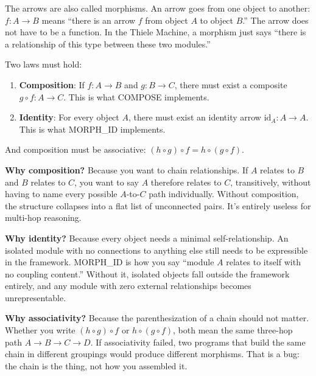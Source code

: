 \documentclass[11pt,a4paper]{article}
\theoremstyle{plain}
\theoremstyle{definition}
\theoremstyle{remark}
\begin{document}
The arrows are also called morphisms. An arrow goes from one object to another: $f : A \to B$ means ``there is an arrow $f$ from object $A$ to object $B$.'' The arrow does not have to be a function. In the Thiele Machine, a morphism just says ``there is a relationship of this type between these two modules.''

Two laws must hold:
\begin{enumerate}
\item \textbf{Composition}: If $f : A \to B$ and $g : B \to C$, there must exist a composite $g \circ f : A \to C$. This is what COMPOSE implements.
\item \textbf{Identity}: For every object $A$, there must exist an identity arrow $\text{id}_A : A \to A$. This is what MORPH\_ID implements.
\end{enumerate}

And composition must be associative: $(h \circ g) \circ f = h \circ (g \circ f)$.

\medskip
\noindent\textbf{Why composition?} Because you want to chain relationships. If $A$ relates to $B$ and $B$ relates to $C$, you want to say $A$ therefore relates to $C$, transitively, without having to name every possible $A$-to-$C$ path individually. Without composition, the structure collapses into a flat list of unconnected pairs. It's entirely useless for multi-hop reasoning.

\medskip
\noindent\textbf{Why identity?} Because every object needs a minimal self-relationship. An isolated module with no connections to anything else still needs to be expressible in the framework. MORPH\_ID is how you say ``module $A$ relates to itself with no coupling content.'' Without it, isolated objects fall outside the framework entirely, and any module with zero external relationships becomes unrepresentable.

\medskip
\noindent\textbf{Why associativity?} Because the parenthesization of a chain should not matter. Whether you write $(h \circ g) \circ f$ or $h \circ (g \circ f)$, both mean the same three-hop path $A \to B \to C \to D$. If associativity failed, two programs that build the same chain in different groupings would produce different morphisms. That is a bug: the chain is the thing, not how you assembled it.
\end{document}
